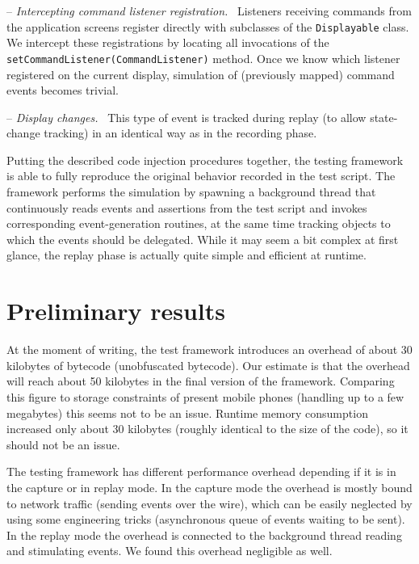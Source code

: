 \documentclass{llncs}
\newcommand{\internalsection}[1]{\par\medskip\noindent-- \emph{#1}~}
\newcommand{\method}[1]{\texttt{#1}}       %
\newcommand{\class}[1]{\texttt{#1}}        %
\begin{document}
\internalsection{Intercepting command listener registration.} Listeners receiving commands from the application
screens register directly with subclasses of the \class{Displayable} class. We intercept these registrations 
by locating all invocations of the \method{set\-Com\-mand\-Listener\-(Command\-Listener)} method. Once we know
which listener registered on the current display, simulation of (previously mapped) command events 
becomes trivial. 

\internalsection{Display changes.} This type of event is tracked during replay (to allow state-change
tracking) in an identical way as in the recording phase. 

\medskip%
Putting the described code injection procedures together, the testing framework is able to
fully reproduce the original behavior recorded in the test script. The framework performs the
simulation by spawning a background thread that continuously reads events and assertions from the
test script and invokes corresponding event-generation routines, at the same time tracking objects
to which the events should be delegated. While it may seem a bit complex at first glance, the replay
phase is actually quite simple and efficient at runtime.


\section{Preliminary results} %

At the moment of writing, the test framework introduces an overhead of about 30 kilobytes of bytecode
(unobfuscated bytecode). Our estimate is that the overhead will reach about 50 kilobytes
in the final version of the framework. Comparing this figure to storage constraints of present
mobile phones (handling up to a few megabytes) this seems not to be an issue. Runtime memory
consumption increased only about 30 kilobytes (roughly identical to the size of the
code), so it should not be an issue.

The testing framework has different performance overhead depending if it is in the capture or in replay mode. 
In the capture mode the overhead is mostly bound to network traffic (sending events over the wire),
which can be easily neglected by using some engineering tricks (asynchronous queue of events waiting to
be sent). In the replay mode the overhead is connected to the background thread reading and
stimulating events. We found this overhead negligible as well.
\end{document}
